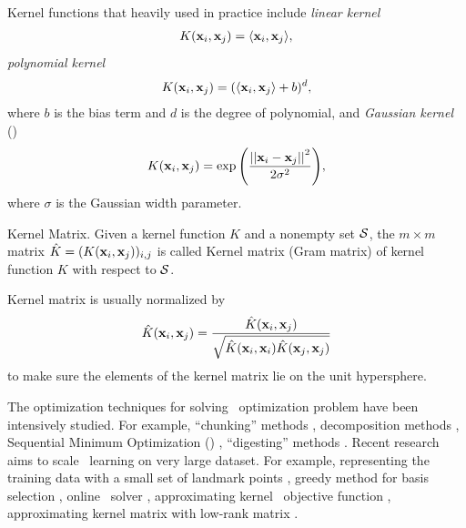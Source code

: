 {Kernel functions that heavily used in practice include \textit{linear kernel}
\begin{align*}
	K(\mathbf {x}_i,\mathbf {x}_j) = \langle \mathbf {x}_i, \mathbf {x}_j \rangle,
\end{align*}
\textit{polynomial kernel}
\begin{align*}
	K(\mathbf {x}_i,\mathbf {x}_j) = (\langle \mathbf {x}_i, \mathbf {x}_j \rangle + b)^d,
\end{align*}
where $b$ is the bias term and $d$ is the degree of polynomial, and \textit{Gaussian kernel} (\rbf)
\begin{align*}
	K(\mathbf {x}_i,\mathbf {x}_j) = \exp{\left(\frac{\left|\left| {\mathbf {x}_i}-{\mathbf {x}_j} \right|\right|^2}{2\sigma^2}\right)},
\end{align*}
where $\sigma$ is the Gaussian width parameter.
\begin{definition}{Kernel Matrix.}
	Given a kernel function $K$ and a nonempty set $\mathcal{S}$, the $m\times m$ matrix $\hat{K}=(K(\mathbf {x}_i,\mathbf {x}_j))_{i,j}$ is called Kernel matrix (Gram matrix) of kernel function $K$ with respect to $\mathcal{S}$.
\end{definition}
Kernel matrix is usually normalized by
\begin{align*}
	\hat{K}(\mathbf {x}_i,\mathbf {x}_j) = \frac{\hat{K}(\mathbf {x}_i,\mathbf {x}_j)}{\sqrt{\hat{K}(\mathbf {x}_i,\mathbf {x}_i)\hat{K}(\mathbf {x}_j,\mathbf {x}_j)}}
\end{align*}
to make sure the elements of the kernel matrix lie on the unit hypersphere.

The optimization techniques for solving \svm\ optimization problem have been intensively studied.
For example, ``chunking'' methods \citep{Vapnik82estimation,Perezcruz04double}, decomposition methods \citep{Osuna97an,Joachims98making}, {Sequential Minimum Optimization} (\smo) \citep{Platt98sequential,Platt99fast}, ``digesting'' methods \citep{Decoste02support}.
Recent research aims to scale \svm\ learning on very large dataset.
For example, representing the training data with a small set of landmark points \citep{Pavlov00towards,Boley04training,Yu05making,Zhang08improved}, greedy method for basis selection \citep{Keerthi06building}, online \svm\ solver \citep{Bordes05fast}, approximating kernel \svm\ objective function \citep{Zhang12scaling, Le13fast}, approximating kernel matrix with low-rank matrix \citep{Smola00sparse,Fine02efficient,Drineas05on,Si14memory}.



}
